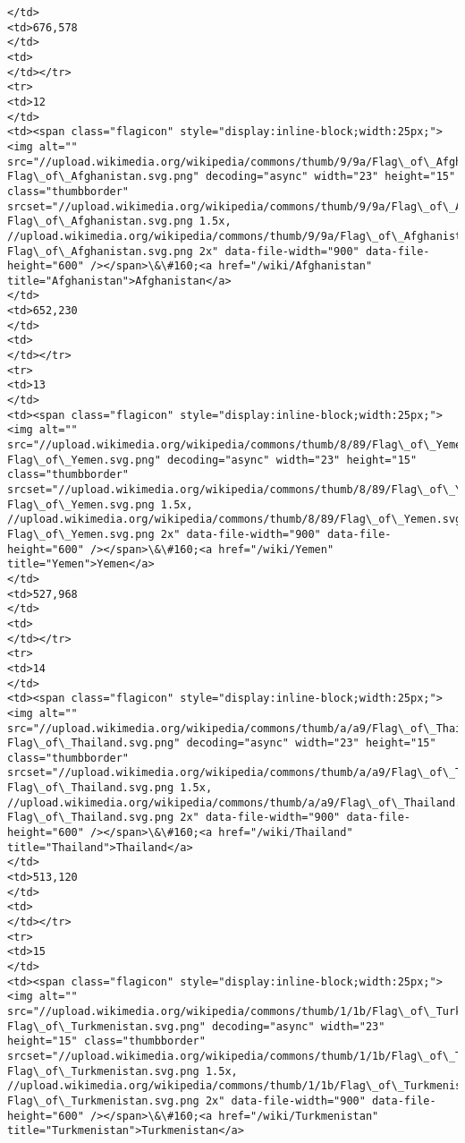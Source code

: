 \documentclass[11pt]{article}
\begin{document}
\begin{Verbatim}[commandchars=\\\{\}]
</td>
<td>676,578
</td>
<td>
</td></tr>
<tr>
<td>12
</td>
<td><span class="flagicon" style="display:inline-block;width:25px;"><img alt="" src="//upload.wikimedia.org/wikipedia/commons/thumb/9/9a/Flag\_of\_Afghanistan.svg/23px-Flag\_of\_Afghanistan.svg.png" decoding="async" width="23" height="15" class="thumbborder" srcset="//upload.wikimedia.org/wikipedia/commons/thumb/9/9a/Flag\_of\_Afghanistan.svg/35px-Flag\_of\_Afghanistan.svg.png 1.5x, //upload.wikimedia.org/wikipedia/commons/thumb/9/9a/Flag\_of\_Afghanistan.svg/45px-Flag\_of\_Afghanistan.svg.png 2x" data-file-width="900" data-file-height="600" /></span>\&\#160;<a href="/wiki/Afghanistan" title="Afghanistan">Afghanistan</a>
</td>
<td>652,230
</td>
<td>
</td></tr>
<tr>
<td>13
</td>
<td><span class="flagicon" style="display:inline-block;width:25px;"><img alt="" src="//upload.wikimedia.org/wikipedia/commons/thumb/8/89/Flag\_of\_Yemen.svg/23px-Flag\_of\_Yemen.svg.png" decoding="async" width="23" height="15" class="thumbborder" srcset="//upload.wikimedia.org/wikipedia/commons/thumb/8/89/Flag\_of\_Yemen.svg/35px-Flag\_of\_Yemen.svg.png 1.5x, //upload.wikimedia.org/wikipedia/commons/thumb/8/89/Flag\_of\_Yemen.svg/45px-Flag\_of\_Yemen.svg.png 2x" data-file-width="900" data-file-height="600" /></span>\&\#160;<a href="/wiki/Yemen" title="Yemen">Yemen</a>
</td>
<td>527,968
</td>
<td>
</td></tr>
<tr>
<td>14
</td>
<td><span class="flagicon" style="display:inline-block;width:25px;"><img alt="" src="//upload.wikimedia.org/wikipedia/commons/thumb/a/a9/Flag\_of\_Thailand.svg/23px-Flag\_of\_Thailand.svg.png" decoding="async" width="23" height="15" class="thumbborder" srcset="//upload.wikimedia.org/wikipedia/commons/thumb/a/a9/Flag\_of\_Thailand.svg/35px-Flag\_of\_Thailand.svg.png 1.5x, //upload.wikimedia.org/wikipedia/commons/thumb/a/a9/Flag\_of\_Thailand.svg/45px-Flag\_of\_Thailand.svg.png 2x" data-file-width="900" data-file-height="600" /></span>\&\#160;<a href="/wiki/Thailand" title="Thailand">Thailand</a>
</td>
<td>513,120
</td>
<td>
</td></tr>
<tr>
<td>15
</td>
<td><span class="flagicon" style="display:inline-block;width:25px;"><img alt="" src="//upload.wikimedia.org/wikipedia/commons/thumb/1/1b/Flag\_of\_Turkmenistan.svg/23px-Flag\_of\_Turkmenistan.svg.png" decoding="async" width="23" height="15" class="thumbborder" srcset="//upload.wikimedia.org/wikipedia/commons/thumb/1/1b/Flag\_of\_Turkmenistan.svg/35px-Flag\_of\_Turkmenistan.svg.png 1.5x, //upload.wikimedia.org/wikipedia/commons/thumb/1/1b/Flag\_of\_Turkmenistan.svg/45px-Flag\_of\_Turkmenistan.svg.png 2x" data-file-width="900" data-file-height="600" /></span>\&\#160;<a href="/wiki/Turkmenistan" title="Turkmenistan">Turkmenistan</a>

\end{Verbatim}
\end{document}
